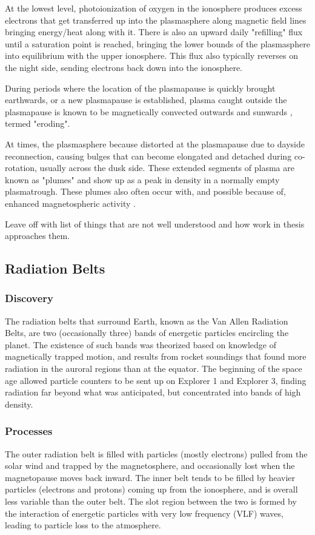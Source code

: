 At the lowest level, photoionization of oxygen in the ionosphere produces excess electrons that get transferred up into the plasmasphere along magnetic field lines bringing energy/heat along with it. There is also an upward daily "refilling" flux until a saturation point is reached, bringing the lower bounds of the plasmasphere into equilibrium with the upper ionosphere. This flux also typically reverses on the night side, sending electrons back down into the ionosphere.

During periods where the location of the plasmapause is quickly brought earthwards, or a new plasmapause is established, plasma caught outside the plasmapause is known to be magnetically convected outwards and sunwards \citep{ErosionRecoveryPlasmasphere}, termed "eroding". 

At times, the plasmasphere because distorted at the plasmapause due to dayside reconnection, causing bulges that can become elongated and detached during co-rotation, usually across the dusk side. These extended segments of plasma are known as "plumes" and show up as a peak in density in a normally empty plasmatrough. These plumes also often occur with, and possible because of, enhanced magnetospheric activity \citep{EvolutionPlasmasphericIons}.

\note Leave off with list of things that are not well understood and how work in thesis approaches them.

\subsection{Radiation Belts}

\subsubsection{Discovery}
The radiation belts that surround Earth, known as the Van Allen Radiation Belts, are two (occasionally three\cite{LinksBetweenPlasmapauseRadiationBelt}) bands of energetic particles encircling the planet. The existence of such bands was theorized based on knowledge of magnetically trapped motion, and results from rocket soundings that found more radiation in the auroral regions than at the equator.  The beginning of the space age allowed particle counters to be sent up on Explorer 1 and Explorer 3, finding radiation far beyond what was anticipated, but concentrated into bands of high density\cite{MagnetoHistory}.

\subsubsection{Processes}
The outer radiation belt is filled with particles (mostly electrons) pulled from the solar wind and trapped by the magnetosphere, and occasionally lost when the magnetopause moves back inward. The inner belt tends to be filled by heavier particles (electrons and protons) coming up from the ionosphere, and is overall less variable than the outer belt\cite{LinksBetweenPlasmapauseRadiationBelt}. The slot region between the two is formed by the interaction of energetic particles with very low frequency (VLF) waves, leading to particle loss to the atmosphere\cite{LongTermVariationsSlotRegion}.

